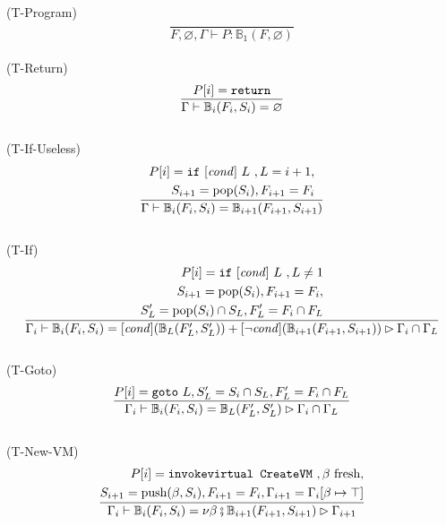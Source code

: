\documentclass{amsart}
\newcommand{\bFunc}{\mathbb{B}}
\renewcommand{\emptyset}{\varnothing}
\numberwithin{equation}{section}
\theoremstyle{plain} %
\theoremstyle{definition}
\theoremstyle{remark}
\begin{document}
\newpage

(T-Program)
\begin{equation*}
\frac{}
{F,\emptyset, \Gamma \vdash P: \bFunc{}_1(F, \emptyset)}
\end{equation*}
\\
(T-Return)
\begin{equation*}
\frac{P[i] = \text{\texttt{return}}}
{\Gamma \vdash \bFunc{}_i(F_i, S_i) = \emptyset}
\end{equation*}
\\
(T-If-Useless)
\begin{equation*}
\frac{\begin{aligned}
P[i] = \text{\texttt{if} $[\text{\textit{cond}}]$ $L$ }, L = i+1,\\
S_{i+1} = \text{pop}(S_i), F_{i+1} = F_i
\end{aligned}}
{\Gamma \vdash \bFunc{}_i(F_i, S_i) = \bFunc{}_{i+1}(F_{i+1}, S_{i+1})}
\end{equation*}
\\
(T-If)
\begin{equation*}\frac{\begin{aligned}
P[i] = \text{\texttt{if} $[\text{\textit{cond}}]$ $L$ }, L \neq 1\\
S_{i+1} = \text{pop}(S_i), F_{i+1} = F_i,\\
S'_{L} = \text{pop}(S_i) \cap S_L, F'_{L} = F_i \cap F_L
\end{aligned}}
{\Gamma_i \vdash \bFunc{}_i(F_i, S_i) = [\text{\textit{cond}}] (\bFunc{}_{L}(F'_{L}, S'_{L})) +
 [\neg \text{\textit{cond}}] (\bFunc{}_{i+1}(F_{i+1}, S_{i+1})) \rhd \Gamma_i \cap \Gamma_L }
\end{equation*}
\\
(T-Goto)
\begin{equation*}
\frac{P[i] = \text{\texttt{goto} $L$}, S'_L = S_i \cap S_L, F'_L = F_i \cap F_L}
{\Gamma_i \vdash \bFunc{}_i(F_i, S_i) = \bFunc{}_{L}(F'_L, S'_L) \rhd \Gamma_i \cap \Gamma_L}
\end{equation*}
\\
(T-New-VM)
\begin{equation*}\frac{\begin{aligned}
P[i] = \text{\texttt{invokevirtual CreateVM} }, \beta \text{ fresh},\\
S_{i+1} = \text{push}(\beta,S_i), F_{i+1} = F_i, \Gamma_{i+1} = \Gamma_i[\beta \mapsto \top]
\end{aligned}}
{\Gamma_i \vdash \bFunc{}_i(F_i, S_i) = \nu \beta \fatsemi \bFunc{}_{i+1}(F_{i+1}, S_{i+1}) \rhd \Gamma_{i+1}}
\end{equation*}
\end{document}
